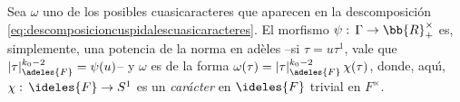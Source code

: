 Sea $\omega$ uno de los posibles cuasicaracteres que aparecen en la
descomposici\'{o}n \eqref{eq:descomposicioncuspidalescuasicaracteres}. El
morfismo $\psi:\,\Gamma\rightarrow\bb{R}^{\times}_{+}$ es, simplemente, una
potencia de la norma en ad\`{e}les --si $\tau=u\tau^{1}$, vale que
$|\tau|_{\adeles{F}}^{k_{0}-2}=\psi(u)$-- y $\omega$ es de la forma
$\omega(\tau)=|\tau|_{\adeles{F}}^{k_{0}-2}\,\chi(\tau)$, donde, aqu\'{\i},
$\chi:\,\ideles{F}\rightarrow S^{1}$ es un \emph{car\'{a}cter} en $\ideles{F}$
trivial en $F^{\times}$.
